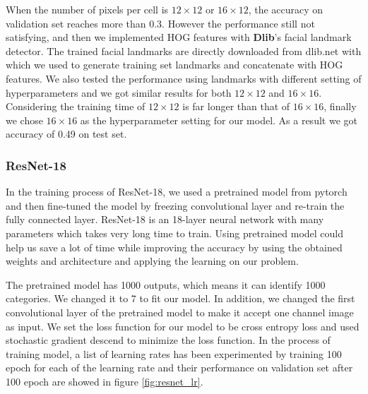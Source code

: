 \documentclass{article}
\begin{document}
When the number of pixels per cell is $12\times12$ or $16\times12$, the accuracy on validation set reaches more than 0.3. However the performance still not satisfying, and then we implemented HOG features with \textbf{Dlib}'s facial landmark detector. The trained facial landmarks are directly downloaded from dlib.net with which we used to generate training set landmarks and concatenate with HOG features. We also tested the performance using landmarks with different setting of hyperparameters and we got similar results for both $12\times12$ and $16\times16$. Considering the training time of $12\times12$ is far longer than that of $16\times16$, finally we chose $16\times16$ as the hyperparameter setting for our model. As a result we got accuracy of 0.49 on test set.

\subsubsection{ResNet-18}
In the training process of ResNet-18, we used a pretrained model from pytorch and then fine-tuned the model by freezing convolutional layer and re-train the fully connected layer. ResNet-18 is an 18-layer neural network with many parameters which takes very long time to train. Using pretrained model could help us save a lot of time while improving the accuracy by using the obtained weights and architecture and applying the learning on our problem. 

The pretrained model has 1000 outputs, which means it can identify 1000 categories. We changed it to 7 to fit our model. In addition, we changed the first convolutional layer of the pretrained model to make it accept one channel image as input. We set the loss function for our model to be cross entropy loss and used stochastic gradient descend to minimize the loss function. In the process of training model, a list of learning rates has been experimented by training 100 epoch for each of the learning rate and their performance on validation set after 100 epoch are showed in figure \ref{fig:resnet_lr}.
\end{document}
